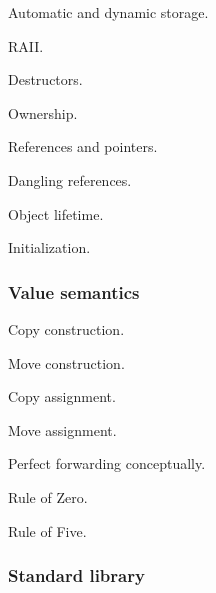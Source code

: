 \documentclass[11pt,letterpaper]{article}
\begin{document}
\begin{topics}

\item Automatic and dynamic storage.

\item RAII.

\item Destructors.

\item Ownership.

\item References and pointers.

\item Dangling references.

\item Object lifetime.

\item Initialization.

\end{topics}

\subsubsection*{Value semantics}

\begin{topics}

\item Copy construction.

\item Move construction.

\item Copy assignment.

\item Move assignment.

\item Perfect forwarding conceptually.

\item Rule of Zero.

\item Rule of Five.

\end{topics}

\subsubsection*{Standard library}
\end{document}
